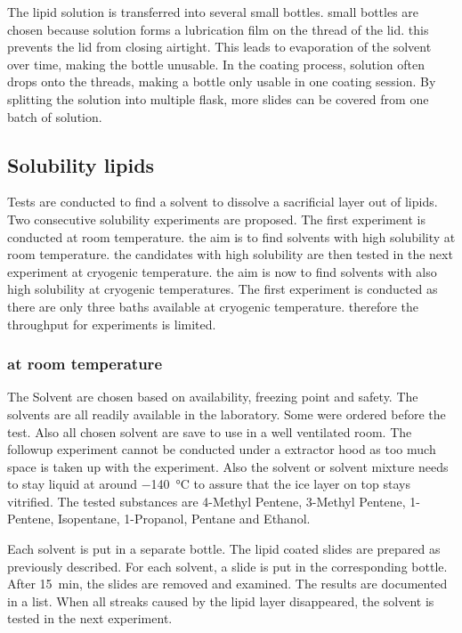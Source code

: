 The lipid solution is transferred into several small bottles. small bottles are chosen because solution forms a lubrication film on the thread of the lid. this prevents the lid from closing airtight. This leads to evaporation of the solvent over time, making the bottle unusable. In the coating process, solution often drops onto the threads, making a bottle only usable in one coating session. By splitting the solution into multiple flask, more slides can be covered from one batch of solution.

\subsection{Solubility lipids}

Tests are conducted to find a solvent to dissolve a sacrificial layer out of lipids. Two consecutive solubility experiments are proposed. The first experiment is conducted at room temperature. the aim is to find solvents with high solubility at room temperature. the candidates with high solubility are then tested in the next experiment at cryogenic temperature. the aim is now to find solvents with also high solubility at cryogenic temperatures. The first experiment is conducted as there are only three baths available at cryogenic temperature. therefore the throughput for experiments is limited.

\subsubsection{at room temperature}

The Solvent are chosen based on availability, freezing point and safety. The solvents are all readily available in the laboratory. Some were ordered before the test. Also all chosen solvent are save to use in a well ventilated room. The followup experiment cannot be conducted under a extractor hood as too much space is taken up with the experiment. Also the solvent or solvent mixture needs to stay liquid at around \SI{-140}{\degreeCelsius} to assure that the ice layer on top stays vitrified. The tested substances are 4-Methyl Pentene, 3-Methyl Pentene, 1-Pentene, Isopentane, 1-Propanol, Pentane and Ethanol. 

Each solvent is put in a separate bottle. The lipid coated slides are prepared as previously described. For each solvent, a slide is put in the corresponding bottle. After \SI{15}{\minute}, the slides are removed and examined. The results are documented in a list. When all streaks caused by the lipid layer disappeared, the solvent is tested in the next experiment.


